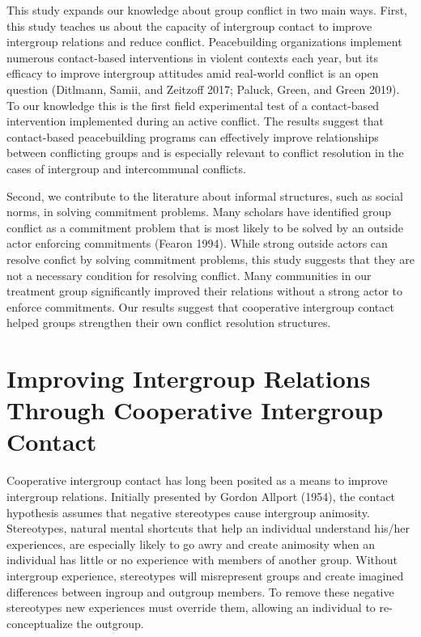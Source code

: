 \documentclass[11pt]{article}
\begin{document}
This study expands our knowledge about group conflict in two main ways.
First, this study teaches us about the capacity of intergroup contact to
improve intergroup relations and reduce conflict. Peacebuilding
organizations implement numerous contact-based interventions in violent
contexts each year, but its efficacy to improve intergroup attitudes
amid real-world conflict is an open question (Ditlmann, Samii, and
Zeitzoff 2017; Paluck, Green, and Green 2019). To our knowledge this is
the first field experimental test of a contact-based intervention
implemented during an active conflict. The results suggest that
contact-based peacebuilding programs can effectively improve
relationships between conflicting groups and is especially relevant to
conflict resolution in the cases of intergroup and intercommunal
conflicts.

Second, we contribute to the literature about informal structures, such
as social norms, in solving commitment problems. Many scholars have
identified group conflict as a commitment problem that is most likely to
be solved by an outside actor enforcing commitments (Fearon 1994). While
strong outside actors can resolve confict by solving commitment
problems, this study suggests that they are not a necessary condition
for resolving conflict. Many communities in our treatment group
significantly improved their relations without a strong actor to enforce
commitments. Our results suggest that cooperative intergroup contact
helped groups strengthen their own conflict resolution structures.

\hypertarget{improving-intergroup-relations-through-cooperative-intergroup-contact}{%
\section{Improving Intergroup Relations Through Cooperative Intergroup
Contact}\label{improving-intergroup-relations-through-cooperative-intergroup-contact}}

Cooperative intergroup contact has long been posited as a means to
improve intergroup relations. Initially presented by Gordon Allport
(1954), the contact hypothesis assumes that negative stereotypes cause
intergroup animosity. Stereotypes, natural mental shortcuts that help an
individual understand his/her experiences, are especially likely to go
awry and create animosity when an individual has little or no experience
with members of another group. Without intergroup experience,
stereotypes will misrepresent groups and create imagined differences
between ingroup and outgroup members. To remove these negative
stereotypes new experiences must override them, allowing an individual
to re-conceptualize the outgroup.
\end{document}
